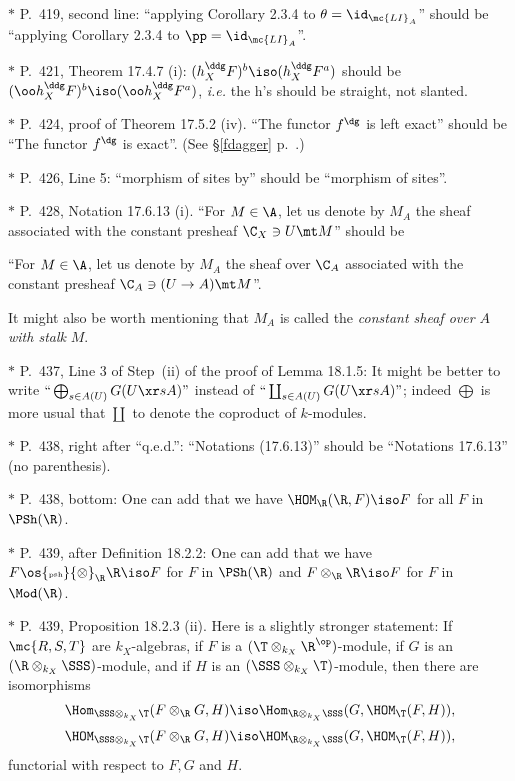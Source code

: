 \documentclass[12pt]{article}
\theoremstyle{remark}
\theoremstyle{definition}
\begin{document}
\nn$*$ P.~419, second line: ``applying Corollary 2.3.4 to $\theta=\id_{\mc{LI}_A}$'' should be ``applying Corollary 2.3.4 to $\pp=\id_{\mc{LI}_A}$''.

\nn$*$ P.~421, Theorem 17.4.7 (i): $(h_X^\ddg F)^b\iso(h_X^\ddg F^a)$ should be $(\oo h_X^\ddg F)^b\iso(\oo h_X^\ddg F^a)$, \emph{i.e.} the h's should be straight, not slanted.

\nn$*$ P.~424, proof of Theorem 17.5.2 (iv). ``The functor $f^\dg$ is left exact'' should be ``The functor $f^\dg$ is exact''. (See \S\ref{fdagger} p.~.) 

\nn$*$ P.~426, Line 5: ``morphism of sites by'' should be ``morphism of sites''.

\nn$*$ P.~428, Notation 17.6.13 (i). ``For $M\in\A$, let us denote by $M_A$ the sheaf associated with the constant presheaf $\C_X\ni U\mt M$'' should be  

``For $M\in\A$, let us denote by $M_A$ the sheaf over $\C_A$ associated with the constant presheaf $\C_A\ni(U\to A)\mt M$''. 

It might also be worth mentioning that $M_A$ is called the \emph{constant sheaf over $A$ with stalk} $M$. 

\nn$*$ P.~437, Line 3 of Step~(ii) of the proof of Lemma 18.1.5: It might be better to write $``\bigoplus_{s\in A(U)}G(U\xr sA)"$ instead of $``\coprod_{s\in A(U)}G(U\xr sA)"$; indeed $\bigoplus$ is more usual that $\coprod$ to denote the coproduct of $k$-modules. 

\nn$*$ P.~438, right after ``q.e.d.'': ``Notations (17.6.13)'' should be ``Notations 17.6.13'' (no parenthesis). 

\nn$*$ P.~438, bottom: One can add that we have $\HOM_\R(\R,F)\iso F$ for all $F$ in $\PSh(\R)$. 

\nn$*$ P.~439, after Definition 18.2.2: One can add that we have $F\os{\text{\tiny psh}}{\otimes}_\R\R\iso F$ for $F$ in $\PSh(\R)$ and $F\otimes_\R\R\iso F$ for $F$ in $\Mod(\R)$. 

\nn$*$ P.~439, Proposition 18.2.3 (ii). Here is a slightly stronger statement: If $\mc{R,S,T}$ are $k_X$-algebras, if $F$ is a $(\T\otimes_{k_X}\R^{\op})$-module, if $G$ is an $(\R\otimes_{k_X}\SSS)$-module, and if $H$ is an $(\SSS\otimes_{k_X}\T)$-module, then there are isomorphisms 
$$
\Hom_{\SSS\otimes_{k_X}\T}(F\otimes_\R G,H)\iso
\Hom_{\R\otimes_{k_X}\SSS}(G,\HOM_\T(F,H)), 
$$ 
$$
\HOM_{\SSS\otimes_{k_X}\T}(F\otimes_\R G,H)\iso
\HOM_{\R\otimes_{k_X}\SSS}(G,\HOM_\T(F,H)), 
$$ 
functorial with respect to $F,G$ and $H$.
\end{document}
